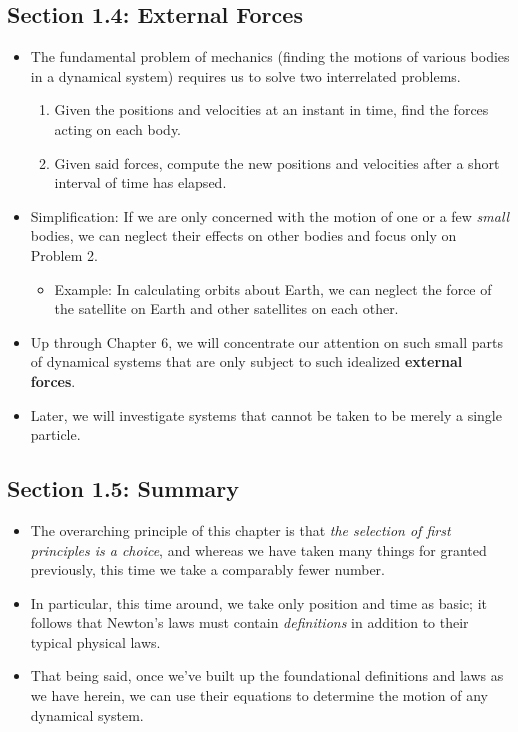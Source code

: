 \documentclass[../notes.tex]{subfiles}
\begin{document}
\subsection*{Section 1.4: External Forces}
\begin{itemize}
    \item The fundamental problem of mechanics (finding the motions of various bodies in a dynamical system) requires us to solve two interrelated problems.
    \begin{enumerate}
        \item Given the positions and velocities at an instant in time, find the forces acting on each body.
        \item Given said forces, compute the new positions and velocities after a short interval of time has elapsed.
    \end{enumerate}
    \item Simplification: If we are only concerned with the motion of one or a few \emph{small} bodies, we can neglect their effects on other bodies and focus only on Problem 2.
    \begin{itemize}
        \item Example: In calculating orbits about Earth, we can neglect the force of the satellite on Earth and other satellites on each other.
    \end{itemize}
    \item Up through Chapter 6, we will concentrate our attention on such small parts of dynamical systems that are only subject to such idealized \textbf{external forces}.
    \item Later, we will investigate systems that cannot be taken to be merely a single particle.
\end{itemize}


\subsection*{Section 1.5: Summary}
\begin{itemize}
    \item The overarching principle of this chapter is that \emph{the selection of first principles is a choice}, and whereas we have taken many things for granted previously, this time we take a comparably fewer number.
    \item In particular, this time around, we take only position and time as basic; it follows that Newton's laws must contain \emph{definitions} in addition to their typical physical laws.
    \item That being said, once we've built up the foundational definitions and laws as we have herein, we can use their equations to determine the motion of any dynamical system.
\end{itemize}
\end{document}
